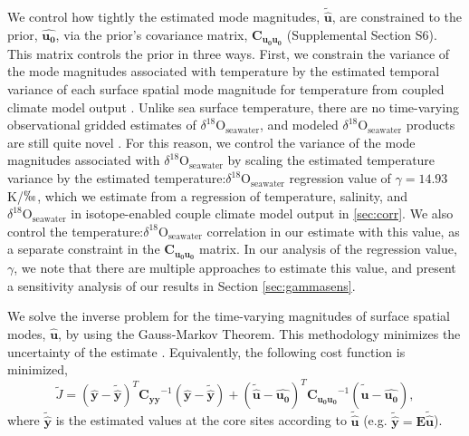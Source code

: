 \documentclass[draft]{agujournal2019}
\begin{document}
We control how tightly the estimated mode magnitudes,
$\mathbf{\tilde{\hat{u}}}$, are constrained to the prior,
$\mathbf{\hat{u_{0}}}$, via the prior's covariance matrix,
$\mathbf{C_{u_{0}u_{0}}}$ (Supplemental Section
 S6). %
This matrix controls the prior in
three ways. First, we constrain the variance of the mode magnitudes
associated with temperature by the estimated temporal variance of each
surface spatial mode magnitude for temperature from coupled climate
model output \cite{cesm2}. Unlike sea
surface temperature, there are no time-varying observational gridded
estimates of $\delta^{18}\mathrm{O}_{\mathrm{seawater}}$, and modeled
$\delta^{18}\mathrm{O}_{\mathrm{seawater}}$ products are still quite novel
\cite[]{Breitkreuz-Paul-2018:Dynamical, Brady-Stevenson-2019:Connected}.
For this reason, we control
the variance of the mode magnitudes associated with
$\delta^{18}\mathrm{O}_{\mathrm{seawater}}$ by scaling the estimated
temperature variance by the estimated
temperature:$\delta^{18}\mathrm{O}_{\mathrm{seawater}}$ regression value of
$\gamma = 14.93$ K/$\permil$, which we estimate from a
  regression of temperature, salinity, and $\delta^{18}\mathrm{O}_{\mathrm{seawater}}$
in isotope-enabled couple
climate model output in \ref{sec:corr}. We also control the
temperature:$\delta^{18}\mathrm{O}_{\mathrm{seawater}}$ correlation in our
estimate with this value, as a separate constraint in the
$\mathbf{C_{u_{0}u_{0}}}$ matrix. In our analysis of the
regression value, $\gamma$, we note that there are multiple approaches
to estimate this value, and present a sensitivity analysis of our
results in Section \ref{sec:gammasens}.

We solve the inverse problem for the time-varying magnitudes of
surface spatial modes, $\mathbf{\hat{u}}$, by using the Gauss-Markov
Theorem. This methodology minimizes the uncertainty of the estimate
\cite[]{Wunsch-2006:Discrete}. Equivalently, the following cost
function is minimized,
\begin{equation}  
\label{eq:costfunc}
\tilde{J} = \left(\mathbf{\hat{y}}-\mathbf{\tilde{\hat{y}}}\right)^T\mathbf{C_{yy}}^{-1}\left(\mathbf{\hat{y}}-\mathbf{\tilde{\hat{y}}}\right)+(\mathbf{\tilde{\hat{u}} - \hat{u_0}})^T\mathbf{C_{u_{0}u_{0}}}^{-1}(\mathbf{\tilde{\hat{u}} - \hat{u_0}}), 
\end{equation}
where $\mathbf{\tilde{\hat{y}}}$ is the estimated values at the core
sites according to $\mathbf{\tilde{\hat{u}}}$
(e.g. $\mathbf{\tilde{\hat{y}}} = \mathbf{E\tilde{\hat{u}}}$).
\end{document}
